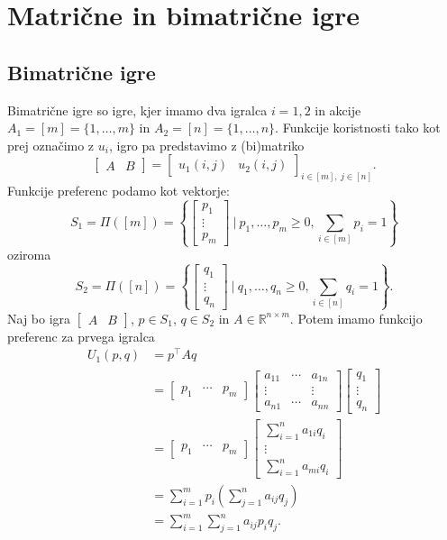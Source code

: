 \documentclass[10pt, a4paper]{article}
\newcommand{\R}{\mathbb {R}}
\begin{document}
\section{Matrične in bimatrične igre}

\subsection{Bimatrične igre}

Bimatrične igre so igre, kjer imamo dva igralca $i = 1, 2$ in 
akcije $A_1 = [m] = \{1, \dots, m\}$ in $A_2 = [n] = \{1, \dots, n\}$.
Funkcije koristnosti tako kot prej označimo z $u_i$, igro pa predstavimo z (bi)matriko 
$$\begin{bmatrix}
  A & B
\end{bmatrix} = \begin{bmatrix}
  u_1(i, j) & u_2 (i, j)
\end{bmatrix}_{i \in [m],\ j \in [n]}.$$
Funkcije preferenc podamo kot vektorje:
$$S_1 = \Pi([m]) = \left\lbrace \begin{bmatrix}
  p_1 \\ \vdots \\ p_m
\end{bmatrix}\ \Big|\ p_1, \dots, p_m \geq 0, \sum_{i \in [m]} p_i = 1 \right\rbrace$$
oziroma 
$$S_2 = \Pi([n]) = \left\lbrace \begin{bmatrix}
  q_1 \\ \vdots \\ q_n
\end{bmatrix}\ \Big|\ q_1, \dots, q_n \geq 0, \sum_{i \in [n]} q_i = 1 \right\rbrace.$$
Naj bo igra $\begin{bmatrix}
  A & B
\end{bmatrix}$, $p \in S_1$, $q \in S_2$ in $A \in \R^{n \times m}$.
Potem imamo funkcijo preferenc za prvega igralca
\begin{align*}
  U_1 (p, q) &= p^{\top} A q\\
  &= \begin{bmatrix}
    p_1 & \cdots & p_m
  \end{bmatrix} \begin{bmatrix}
    a_{11} & \cdots & a_{1n}\\
    \vdots & & \vdots\\
    a_{n1} & \cdots & a_{nn}
  \end{bmatrix} \begin{bmatrix}
    q_1 \\ \vdots \\q_n
  \end{bmatrix}\\
  &= \begin{bmatrix}
    p_1 & \cdots & p_m
  \end{bmatrix} \begin{bmatrix}
    \sum_{i = 1} ^n a_{1i} q_{i}\\
    \vdots\\
    \sum_{i = 1} ^n a_{mi} q_{i}
  \end{bmatrix}\\
  &= \sum_{i = 1} ^m p_i \left(\sum_{j = 1}^n a_{ij} q_j\right)\\
  &= \sum_{i = 1} ^m \sum_{j = 1} ^n a_{ij} p_i q_j.
\end{align*}
\end{document}
